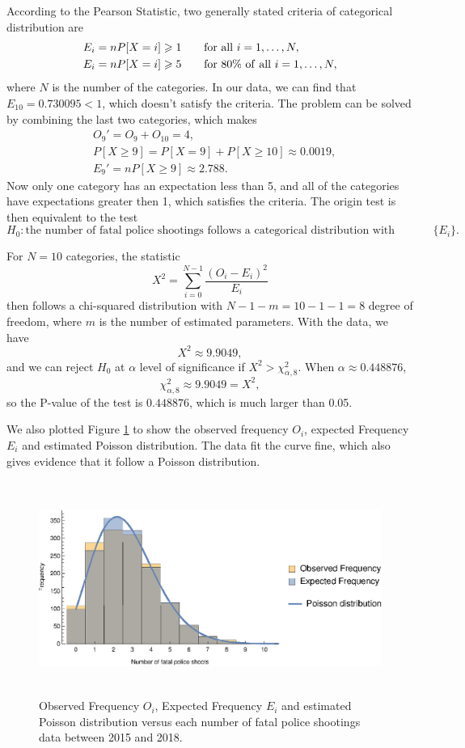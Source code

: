 \documentclass[conf]{new-aiaa}
\begin{document}
According to the Pearson Statistic, two generally stated criteria of  categorical distribution are
\begin{align}
E_i=nP[X=i]\geqslant1 & \qquad {\rm for\ all\ }i=1,\dots,N,\\
E_i=nP[X=i]\geqslant5 & \qquad {\rm for\ 80\%\ of\ all\ }i=1,\dots,N,
\end{align}
where $N$ is the number of the categories. In our data, we can find that $E_{10}=0.730095<1$, which doesn't satisfy the criteria. The problem can be solved by combining the last two categories, which makes
\begin{align*}
&O_9'=O_9+O_{10}=4,\\
&P[X\geqslant9]=P[X=9]+P[X\geqslant10]\approx 0.0019,\\
&E_9'=nP[X\geqslant9]\approx2.788.
\end{align*}
Now only one category has an expectation less than 5, and all of the categories have expectations greater then 1, which satisfies the criteria. The origin test is then equivalent to the test
$$H_0:\text{the number of fatal police shootings follows a categorical distribution with parameters }\{E_i\}.$$

For $N = 10$ categories, the statistic
\begin{equation}
X^2=\sum_{i=0}^{N-1}\frac{(O_i-E_i)^2}{E_i}
\end{equation}
then follows a chi-squared distribution with $N-1-m=10-1-1=8$
degree of freedom, where $m$ is the number of estimated parameters. With the data, we have
$$X^2\approx9.9049,$$
and we can reject $H_0$ at $\alpha$ level of significance if $X^2>\chi^2_{\alpha,8}$. When $\alpha\approx0.448876$,
$$\chi^2_{\alpha,8}\approx9.9049=X^2,$$
so the P-value of the test is $0.448876$, which is much larger than 0.05. \medskip

We also plotted Figure \ref{fig:q3-all-exp} to show the observed frequency $O_i$, expected Frequency $E_i$ and estimated Poisson distribution. The data fit the curve fine, which also gives evidence that it follow a Poisson distribution. \medskip

\begin{figure}[!htbp]
\centering
\includegraphics[height=7cm]{q3/q3-all-exp.eps}
\caption{Observed Frequency $O_i$, Expected Frequency $E_i$ and estimated Poisson distribution versus each number of fatal police shootings data between 2015 and 2018.}
\label{fig:q3-all-exp}
\end{figure}
\end{document}
